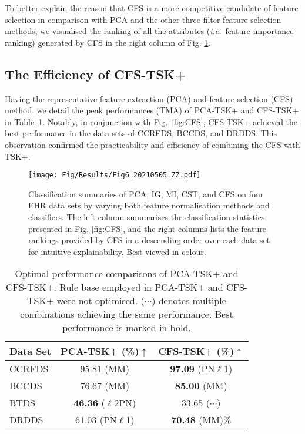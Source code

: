 \documentclass{article}
\newcommand{\zzie}{\emph{i.e.}~}
\newcommand*{\1}{\textcolor{magenta}}
\begin{document}
	




	To better explain the reason that CFS is a more competitive candidate of feature selection in comparison with PCA and the other three filter feature selection methods, we visualised the ranking of all the attributes (\zzie feature importance ranking) generated by CFS in the right column of Fig. \ref{fig:CFS2}. 
	








	














	\subsection{The Efficiency of CFS-TSK+}
	Having the representative feature extraction (PCA) and feature selection (CFS) method, we detail the peak performances (TMA) of PCA-TSK+ and CFS-TSK+ in Table~\ref{tbl:cfstsk+}. Notably, in conjunction with Fig.~\ref{fig:CFS}, CFS-TSK+ achieved the best performance in the data sets of CCRFDS, BCCDS, and DRDDS. This observation confirmed the practicability and efficiency of combining the CFS with TSK+. 
	
	\begin{figure}[!ht]
		\centering
		\texttt{[image: Fig/Results/Fig6\_20210505\_ZZ.pdf]}
		\caption{Classification summaries of PCA, IG, MI, CST, and CFS on four EHR data sets by varying both feature normalisation methods and classifiers. The left column summarises the classification statistics presented in Fig. \ref{fig:CFS}, and the right columns lists the feature rankings provided by CFS in a descending order over each data set for intuitive explainability. Best viewed in colour.}
		\label{fig:CFS2}
	\end{figure}
	
	\begin{table}[!ht]
		\centering
		\caption{Optimal performance comparisons of PCA-TSK+ and CFS-TSK+. Rule base employed in PCA-TSK+ and CFS-TSK+ were not optimised. ($\cdots$) denotes multiple combinations achieving the same performance. Best performance is marked in bold.}
		\begin{tabular}{l|c|c}
			\hline
			Data Set
			& PCA-TSK+ (\%)$\uparrow$ & CFS-TSK+ (\%)$\uparrow$\\
			\hline
			\hline
			CCRFDS & 95.81 (MM) & \textbf{97.09} (PN$\ell$1)\\ 
			\hline
			BCCDS & 76.67 (MM) & \textbf{85.00} (MM)\\ 
			\hline
			BTDS & \textbf{46.36} ($\ell$2PN) & 33.65 ($\cdots$)\\ 
			\hline
			DRDDS & 61.03 (PN$\ell$1) & \textbf{70.48} (MM)\%\\ 
			\hline
		\end{tabular}
		\label{tbl:cfstsk+}
	\end{table}
\end{document}
